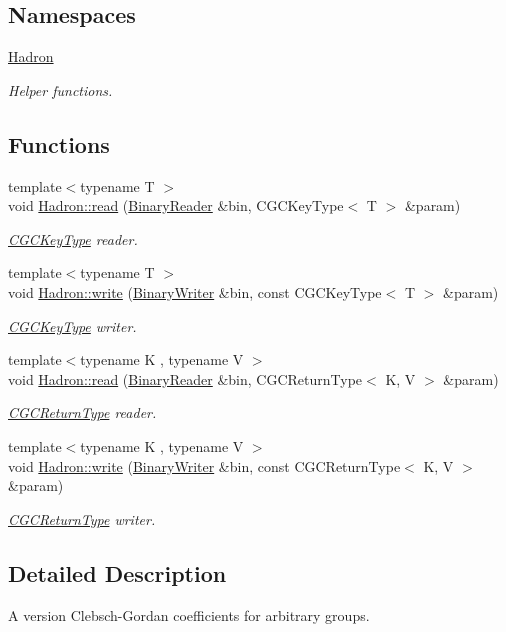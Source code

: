 \subsection*{Namespaces}
\begin{DoxyCompactItemize}
\item 
 \mbox{\hyperlink{namespaceHadron}{Hadron}}
\begin{DoxyCompactList}\small\item\em Helper functions. \end{DoxyCompactList}\end{DoxyCompactItemize}
\subsection*{Functions}
\begin{DoxyCompactItemize}
\item 
{\footnotesize template$<$typename T $>$ }\\void \mbox{\hyperlink{namespaceHadron_af29a7ca56e3472207899938a2a50babe}{Hadron\+::read}} (\mbox{\hyperlink{classADATIO_1_1BinaryReader}{Binary\+Reader}} \&bin, C\+G\+C\+Key\+Type$<$ T $>$ \&param)
\begin{DoxyCompactList}\small\item\em \mbox{\hyperlink{structHadron_1_1CGCKeyType}{C\+G\+C\+Key\+Type}} reader. \end{DoxyCompactList}\item 
{\footnotesize template$<$typename T $>$ }\\void \mbox{\hyperlink{namespaceHadron_aa23076bfdc2f1ebd99330197de102a6d}{Hadron\+::write}} (\mbox{\hyperlink{classADATIO_1_1BinaryWriter}{Binary\+Writer}} \&bin, const C\+G\+C\+Key\+Type$<$ T $>$ \&param)
\begin{DoxyCompactList}\small\item\em \mbox{\hyperlink{structHadron_1_1CGCKeyType}{C\+G\+C\+Key\+Type}} writer. \end{DoxyCompactList}\item 
{\footnotesize template$<$typename K , typename V $>$ }\\void \mbox{\hyperlink{namespaceHadron_a28b215f1b16c66c9862495bf8c11084f}{Hadron\+::read}} (\mbox{\hyperlink{classADATIO_1_1BinaryReader}{Binary\+Reader}} \&bin, C\+G\+C\+Return\+Type$<$ K, V $>$ \&param)
\begin{DoxyCompactList}\small\item\em \mbox{\hyperlink{structHadron_1_1CGCReturnType}{C\+G\+C\+Return\+Type}} reader. \end{DoxyCompactList}\item 
{\footnotesize template$<$typename K , typename V $>$ }\\void \mbox{\hyperlink{namespaceHadron_a67e12d192d662851e588e9f3504ec45e}{Hadron\+::write}} (\mbox{\hyperlink{classADATIO_1_1BinaryWriter}{Binary\+Writer}} \&bin, const C\+G\+C\+Return\+Type$<$ K, V $>$ \&param)
\begin{DoxyCompactList}\small\item\em \mbox{\hyperlink{structHadron_1_1CGCReturnType}{C\+G\+C\+Return\+Type}} writer. \end{DoxyCompactList}\end{DoxyCompactItemize}


\subsection{Detailed Description}
A version Clebsch-\/\+Gordan coefficients for arbitrary groups. 

